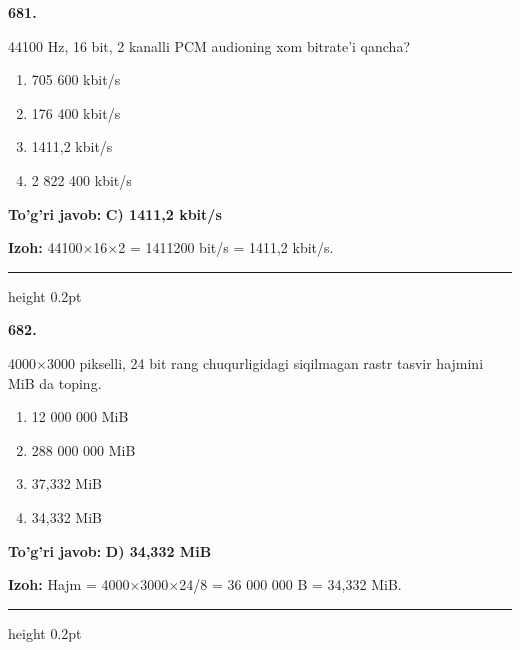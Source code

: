 \documentclass[10pt,a4paper,oneside]{article}
\begin{document}
\noindent\textbf{\color{ink}681.}
\par
44100 Hz, 16 bit, 2 kanalli PCM audioning xom bitrate'i qancha?
\begin{enumerate}[label=\Alph*),leftmargin=9mm]
\item 705 600 kbit/s
\item 176 400 kbit/s
\item 1411,2 kbit/s
\item 2 822 400 kbit/s
\end{enumerate}
\begin{tcolorbox}[enhanced,breakable,colback=teal!4,colframe=teal!50!black,boxrule=0.5pt,arc=1.1mm,left=3mm,right=3mm,top=1.7mm,bottom=1.7mm,before skip=2mm,after skip=2mm]
\textbf{\color{teal}To'g'ri javob:} \textbf{C) 1411,2 kbit/s}
\par\smallskip
\textbf{Izoh:} 44100\ensuremath{\times}16\ensuremath{\times}2 = 1411200 bit/s = 1411,2 kbit/s.
\end{tcolorbox}
\vspace{2mm}\hrule height 0.2pt \vspace{3mm}

\noindent\textbf{\color{ink}682.}
\par
4000\ensuremath{\times}3000 pikselli, 24 bit rang chuqurligidagi siqilmagan rastr tasvir hajmini MiB da toping.
\begin{enumerate}[label=\Alph*),leftmargin=9mm]
\item 12 000 000 MiB
\item 288 000 000 MiB
\item 37,332 MiB
\item 34,332 MiB
\end{enumerate}
\begin{tcolorbox}[enhanced,breakable,colback=teal!4,colframe=teal!50!black,boxrule=0.5pt,arc=1.1mm,left=3mm,right=3mm,top=1.7mm,bottom=1.7mm,before skip=2mm,after skip=2mm]
\textbf{\color{teal}To'g'ri javob:} \textbf{D) 34,332 MiB}
\par\smallskip
\textbf{Izoh:} Hajm = 4000\ensuremath{\times}3000\ensuremath{\times}24/8 = 36 000 000 B = 34,332 MiB.
\end{tcolorbox}
\vspace{2mm}\hrule height 0.2pt \vspace{3mm}
\end{document}
